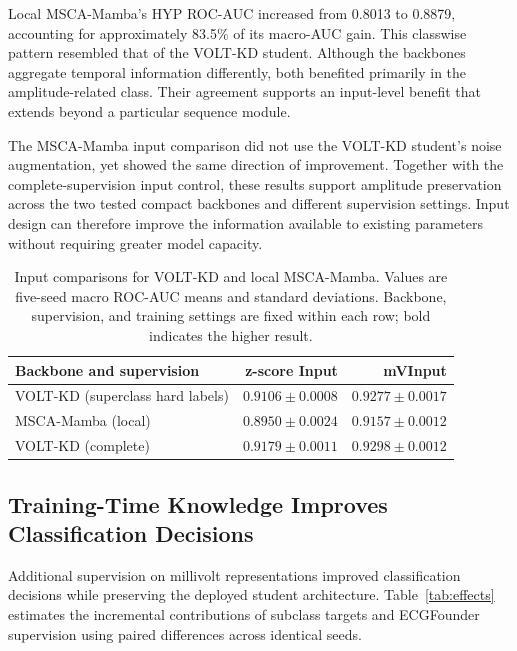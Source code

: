 \documentclass[11pt,a4paper]{article}
\begin{document}
Local MSCA-Mamba's HYP ROC-AUC increased from 0.8013 to 0.8879, accounting for approximately 83.5\% of its macro-AUC gain. This classwise pattern resembled that of the VOLT-KD student. Although the backbones aggregate temporal information differently, both benefited primarily in the amplitude-related class. Their agreement supports an input-level benefit that extends beyond a particular sequence module.

The MSCA-Mamba input comparison did not use the VOLT-KD student's noise augmentation, yet showed the same direction of improvement. Together with the complete-supervision input control, these results support amplitude preservation across the two tested compact backbones and different supervision settings. Input design can therefore improve the information available to existing parameters without requiring greater model capacity.

\begin{table}[htbp]
\centering\small
\caption{Input comparisons for VOLT-KD and local MSCA-Mamba. Values are five-seed macro ROC-AUC means and standard deviations. Backbone, supervision, and training settings are fixed within each row; bold indicates the higher result.}\label{tab:backbones}
\begin{tabularx}{\linewidth}{Yrr}
\toprule
Backbone and supervision & z-score Input & mVInput \\
\midrule
VOLT-KD (superclass hard labels) & $0.9106\pm0.0008$ & $\boldsymbol{0.9277\pm0.0017}$ \\
MSCA-Mamba (local) & $0.8950\pm0.0024$ & $\boldsymbol{0.9157\pm0.0012}$ \\
\midrule
VOLT-KD (complete) & $0.9179\pm0.0011$ & $\boldsymbol{0.9298\pm0.0012}$ \\
\bottomrule
\end{tabularx}
\par\vspace{3pt}{\footnotesize Complete VOLT-KD uses superclass hard labels, diagnostic subclass targets, and teacher soft labels. Its two input configurations use identical supervision.}
\end{table}

\subsection{Training-Time Knowledge Improves Classification Decisions}\label{sec:supervision}
Additional supervision on millivolt representations improved classification decisions while preserving the deployed student architecture. Table~\ref{tab:effects} estimates the incremental contributions of subclass targets and ECGFounder supervision using paired differences across identical seeds.
\end{document}
